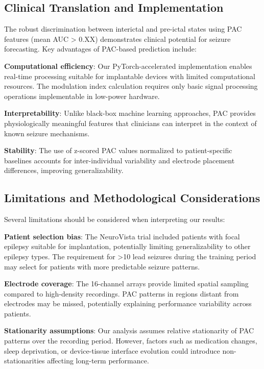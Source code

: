 \subsection{Clinical Translation and Implementation}
The robust discrimination between interictal and pre-ictal states using PAC features (mean AUC > 0.XX) demonstrates clinical potential for seizure forecasting. Key advantages of PAC-based prediction include:

\textbf{Computational efficiency}: Our PyTorch-accelerated implementation enables real-time processing suitable for implantable devices with limited computational resources. The modulation index calculation requires only basic signal processing operations implementable in low-power hardware.

\textbf{Interpretability}: Unlike black-box machine learning approaches, PAC provides physiologically meaningful features that clinicians can interpret in the context of known seizure mechanisms.

\textbf{Stability}: The use of z-scored PAC values normalized to patient-specific baselines accounts for inter-individual variability and electrode placement differences, improving generalizability.

\subsection{Limitations and Methodological Considerations}

Several limitations should be considered when interpreting our results:

\textbf{Patient selection bias}: The NeuroVista trial included patients with focal epilepsy suitable for implantation, potentially limiting generalizability to other epilepsy types. The requirement for >10 lead seizures during the training period may select for patients with more predictable seizure patterns.

\textbf{Electrode coverage}: The 16-channel arrays provide limited spatial sampling compared to high-density recordings. PAC patterns in regions distant from electrodes may be missed, potentially explaining performance variability across patients.

\textbf{Stationarity assumptions}: Our analysis assumes relative stationarity of PAC patterns over the recording period. However, factors such as medication changes, sleep deprivation, or device-tissue interface evolution could introduce non-stationarities affecting long-term performance.

